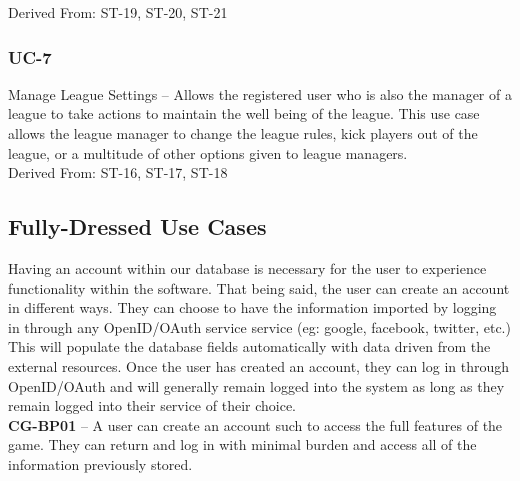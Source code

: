 Derived From: ST-19, ST-20, ST-21\\

\subsubsection {UC-7} Manage League Settings – Allows the registered user who is also the manager of a league to take actions to maintain the well being of the league. This use case allows the league manager to change the league rules, kick players out of the league, or a multitude of other options given to league managers.\\ 

Derived From: ST-16, ST-17, ST-18\\

\subsection{Fully-Dressed Use Cases}

Having an account within our database is necessary for the user to experience
functionality within the software. That being said, the user can create an account in
different ways. They can choose to have the information imported by logging in through
any OpenID/OAuth service service (eg: google, facebook, twitter, etc.) This will populate
the database fields automatically with data driven from the external resources.
Once the user has created an account, they can log in through OpenID/OAuth and will
generally remain logged into the system as long as they remain logged into their service
of their choice.\\

\textbf{CG-BP01} – A user can create an account such to access the full features of the game.
They can return and log in with minimal burden and access all of the information previously
stored. \\

